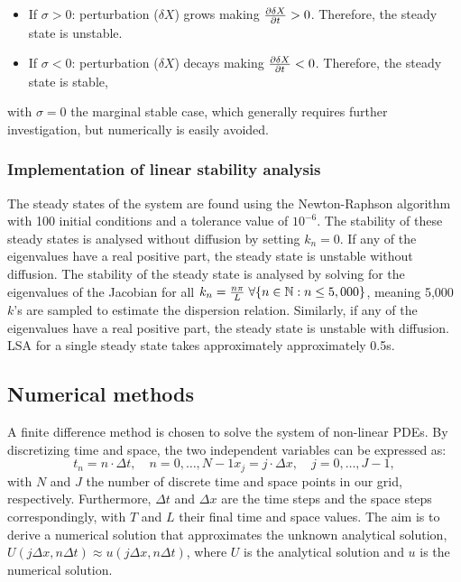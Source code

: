 \documentclass[10pt,letterpaper]{article}
\begin{document}
\begin{itemize}
    \item If $\sigma > 0$: perturbation ($\delta X$) grows making $\pdv{\delta X}{t} > 0$.
    Therefore, the steady state is unstable.
    \item If $\sigma < 0$: perturbation ($\delta X$) decays making $\pdv{\delta X}{t} < 0$.
    Therefore, the steady state is stable,
\end{itemize}

with $\sigma=0$ the marginal stable case, which generally requires further investigation, but numerically is easily avoided.

\subsubsection*{Implementation of linear stability analysis}
The steady states of the system are found using the Newton-Raphson algorithm with 100 initial conditions and a tolerance value of $10^{-6}$. The stability of these steady states is analysed without diffusion by setting $k_{n}=0$. If any of the eigenvalues have a real positive part, the steady state is unstable without diffusion. The stability of the steady state is analysed by solving for the eigenvalues of the Jacobian for all $k_{n}=\frac{n\pi}{L} \hspace{0.1cm}\forall \{n \in \mathbb{N} : n \leq 5,000\} $, meaning 5,000 $k$'s are sampled to estimate the dispersion relation. Similarly, if any of the eigenvalues have a real positive part, the steady state is unstable with diffusion. LSA for a single steady state takes approximately approximately 0.5s.

\subsection*{Numerical methods}\label{numerical methods}
A finite difference method is chosen to solve the system of non-linear PDEs. By discretizing time and space, the two independent variables can be expressed as:
\begin{subequations}
    \begin{equation}
        t_{n} = n \cdot \Delta t, \quad n=0,\dots,N-1
    \end{equation}
    \begin{equation}
        x_{j} = j \cdot \Delta x, \quad j=0, \dots,J-1,
    \end{equation}
\end{subequations}
with $N$ and $J$  the number of discrete time and space points in our grid, respectively. Furthermore, $\Delta t$ and $\Delta x$ are the time steps and the space steps correspondingly, with $T$ and $L$  their final time and space values. The aim is to derive a numerical solution that approximates the unknown analytical solution, $U(j\Delta x, n\Delta t)\approx u( j\Delta x, n\Delta t)$, where $U$ is the analytical solution and $u$ is the numerical solution.
\end{document}

